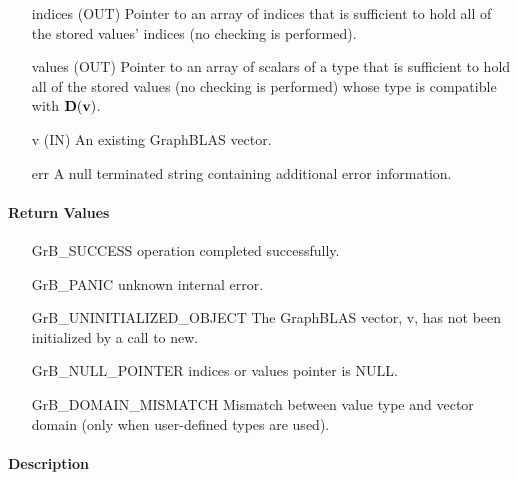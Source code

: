 \begin{itemize}[leftmargin=1.1in]
    \item[{\sf indices}] ({\sf OUT}) Pointer to an array of indices that is sufficient to
                        hold all of the stored values' indices (no checking is performed).
    \item[{\sf values}] ({\sf OUT}) Pointer to an array of scalars of a type that is sufficient to
                        hold all of the stored values (no checking is performed) whose
                        type is compatible with $\bold{D}({\bf v})$.
    \item[{\sf v}]      ({\sf IN})  An existing GraphBLAS vector.
    \item[{\sf err}]     A null terminated string containing additional error information.
\end{itemize}

\paragraph{Return Values}

\begin{itemize}[leftmargin=2.1in]
\item[{\sf GrB\_SUCCESS}]     operation completed successfully.
\item[{\sf GrB\_PANIC}]       unknown internal error.
\item[{\sf GrB\_UNINITIALIZED\_OBJECT}]    The GraphBLAS vector, {\sf v}, has not been
                       initialized by a call to {\sf new}.
\item[{\sf GrB\_NULL\_POINTER}]  {\sf indices} or {\sf values} pointer is {\sf NULL}.
\item[\sf GrB\_DOMAIN\_MISMATCH]  
                       Mismatch between value type and vector domain (only when 
                       user-defined types are used).
\end{itemize}


\paragraph{Description}



